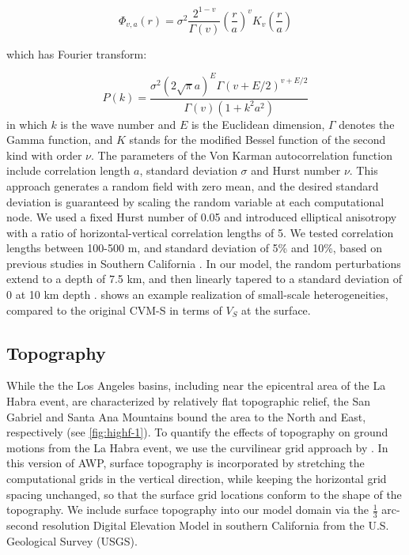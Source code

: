 \begin{equation}\label{eq:highf-1}
  \Phi_{v, a}(r)=\sigma^{2} \frac{2^{1-v}}{\Gamma(v)}\left(\frac{r}{a}\right)^{v} K_{v}\left(\frac{r}{a}\right)
\end{equation}

\noindent which has Fourier transform:

\begin{equation}\label{eq:highf-2}
  P(k)=\frac{\sigma^{2}(2 \sqrt{\pi} a)^{E} \Gamma(v+E / 2)^{v+E / 2}}{\Gamma(v)\left(1+k^{2} a^{2}\right)}
\end{equation}
\noindent in which $k$ is the wave number and $E$ is the Euclidean dimension, $\Gamma$ denotes the Gamma function, and $K$ stands for the modiﬁed Bessel function of the second kind with order $\nu$. The parameters of the Von Karman autocorrelation function include correlation length $a$, standard deviation $\sigma$ and Hurst number $\nu$. This approach generates a random field with zero mean, and the desired standard deviation is guaranteed by scaling the random variable at each computational node. We used a fixed Hurst number of 0.05 and introduced elliptical anisotropy with a ratio of horizontal-vertical correlation lengths of 5. We tested correlation lengths between 100-500 m, and standard deviation of 5\% and 10\%, based on previous studies in Southern California . In our model, the random perturbations extend to a depth of 7.5 km, and then linearly tapered to a standard deviation of 0 at 10 km depth \citep{olsen2018constraints}.  shows an example realization of small-scale heterogeneities, compared to the original CVM-S in terms of $V_S$ at the surface.

\subsection{Topography}
While the the Los Angeles basins, including near the epicentral area of the La Habra event, are characterized by relatively flat topographic relief, the San Gabriel and Santa Ana Mountains bound the area to the North and East, respectively (see \cref{fig:highf-1}). To quantify the effects of topography on ground motions from the La Habra event, we use the curvilinear grid approach by \citet{oreillySimulationElasticWaves2019}. In this version of AWP, surface topography is incorporated by stretching the computational grids in the vertical direction, while keeping the horizontal grid spacing unchanged, so that the surface grid locations conform to the shape of the topography. We include surface topography into our model domain via the $\frac{1}{3}$ arc-second resolution Digital Elevation Model in southern California from the U.S. Geological Survey (USGS).

